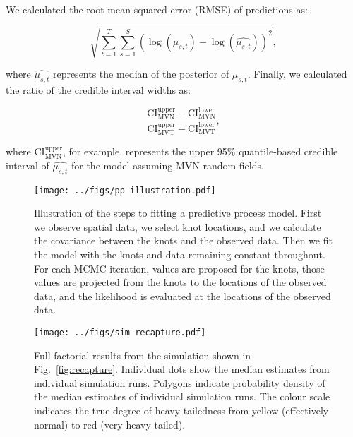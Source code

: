 \documentclass[12pt,english]{article}
\begin{document}
\begin{spacing}{1.4}
We calculated the root mean squared error (RMSE) of predictions as:

\begin{equation}
  \sqrt{ \sum^{T}_{t=1}{ \sum^{S}_{s=1}{ \left( \log(\mu_{s,t}) - \log(\widehat{ \mu_{s,t} }) \right)^2 } } },
\end{equation}

\noindent where $\widehat{\mu_{s,t}}$ represents the median of the posterior of
$\mu_{s,t}$. Finally, we calculated the ratio of the credible interval
widths as:

\begin{equation}
\frac{
\mathrm{CI}_\mathrm{MVN}^\mathrm{upper} - \mathrm{CI}_\mathrm{MVN}^\mathrm{lower}
}{
\mathrm{CI}_\mathrm{MVT}^\mathrm{upper} -
\mathrm{CI}_\mathrm{MVT}^\mathrm{lower}
},
\end{equation}

\noindent where $\mathrm{CI}_\mathrm{MVN}^\mathrm{upper}$, for example,
represents the upper 95\% quantile-based credible interval of
$\widehat{\mu_{s,t}}$ for the model assuming MVN random fields.

\clearpage

\end{spacing}

\renewcommand{\thefigure}{S\arabic{figure}}
\renewcommand{\thetable}{S\arabic{table}}
\setcounter{figure}{0}
\setcounter{table}{0}

\begin{figure}[htb]
  \begin{center}
    \texttt{[image: ../figs/pp-illustration.pdf]}
    \caption{
      Illustration of the steps to fitting a predictive process model.
      First we observe spatial data, we select knot locations,
      and we calculate the covariance between the knots and the observed data.
      Then we fit the model with the knots and data remaining constant throughout.
      For each MCMC iteration, values are proposed for the
      knots, those values are projected from the knots to the locations of the observed data,
      and the likelihood is evaluated at the locations of the observed data.}
    \label{fig:didactic}
  \end{center}
\end{figure}

\clearpage

\begin{figure}[htb]
  \begin{center}
    \texttt{[image: ../figs/sim-recapture.pdf]}
    \caption{
      Full factorial results from the simulation shown in Fig.~\ref{fig:recapture}.
      Individual dots show the median estimates from individual simulation runs.
      Polygons indicate probability density of the median estimates of
      individual simulation runs.
      The colour scale indicates the true degree of heavy tailedness from
      yellow (effectively normal) to red (very heavy tailed).
    }
    \label{fig:recapture-factorial}
  \end{center}
\end{figure}
\end{document}
